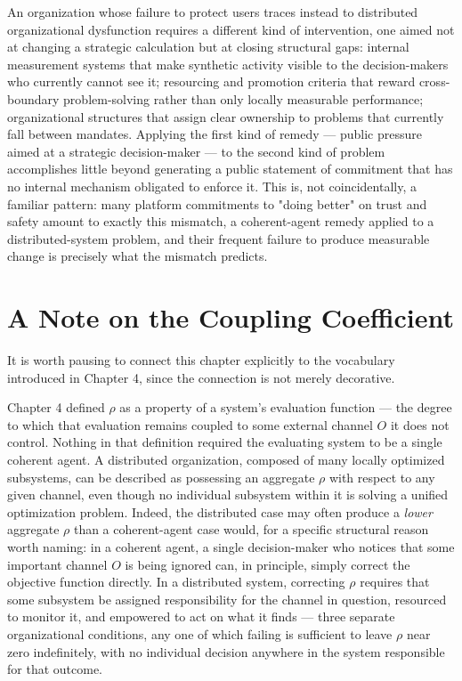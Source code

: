 \documentclass[12pt,a4paper]{book}
\begin{document}
An organization whose failure to protect users traces instead to distributed organizational dysfunction requires a different kind of intervention, one aimed not at changing a strategic calculation but at closing structural gaps: internal measurement systems that make synthetic activity visible to the decision-makers who currently cannot see it; resourcing and promotion criteria that reward cross-boundary problem-solving rather than only locally measurable performance; organizational structures that assign clear ownership to problems that currently fall between mandates. Applying the first kind of remedy — public pressure aimed at a strategic decision-maker — to the second kind of problem accomplishes little beyond generating a public statement of commitment that has no internal mechanism obligated to enforce it. This is, not coincidentally, a familiar pattern: many platform commitments to "doing better" on trust and safety amount to exactly this mismatch, a coherent-agent remedy applied to a distributed-system problem, and their frequent failure to produce measurable change is precisely what the mismatch predicts.

\section{A Note on the Coupling Coefficient}

It is worth pausing to connect this chapter explicitly to the vocabulary introduced in Chapter 4, since the connection is not merely decorative.

Chapter 4 defined $\rho$ as a property of a system's evaluation function — the degree to which that evaluation remains coupled to some external channel $O$ it does not control. Nothing in that definition required the evaluating system to be a single coherent agent. A distributed organization, composed of many locally optimized subsystems, can be described as possessing an aggregate $\rho$ with respect to any given channel, even though no individual subsystem within it is solving a unified optimization problem. Indeed, the distributed case may often produce a \emph{lower} aggregate $\rho$ than a coherent-agent case would, for a specific structural reason worth naming: in a coherent agent, a single decision-maker who notices that some important channel $O$ is being ignored can, in principle, simply correct the objective function directly. In a distributed system, correcting $\rho$ requires that some subsystem be assigned responsibility for the channel in question, resourced to monitor it, and empowered to act on what it finds — three separate organizational conditions, any one of which failing is sufficient to leave $\rho$ near zero indefinitely, with no individual decision anywhere in the system responsible for that outcome.
\end{document}
